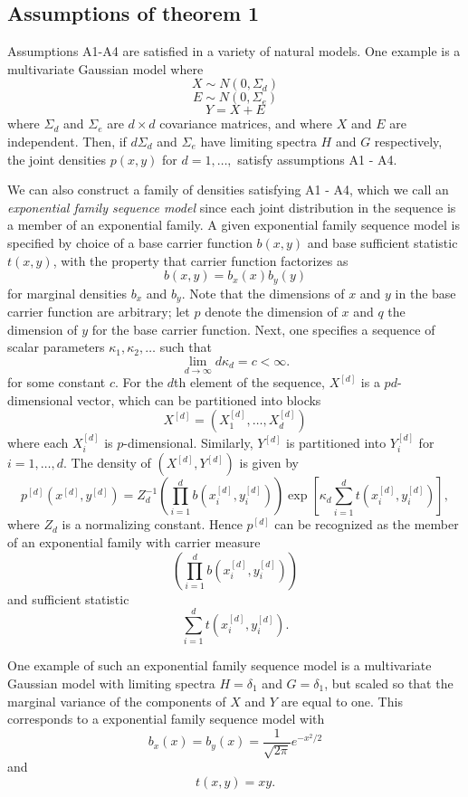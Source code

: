 \documentclass[12pt]{article}
\begin{document}
\subsection{Assumptions of theorem 1}

Assumptions A1-A4 are satisfied in a variety of natural models.
One example is a multivariate Gaussian model where
\[
X \sim N(0, \Sigma_d)
\]
\[
E \sim N(0, \Sigma_e)
\]
\[
Y = X + E
\]
where $\Sigma_d$ and $\Sigma_e$ are $d \times d$ covariance matrices, and where $X$ and $E$ are independent.  Then, if $d \Sigma_d$ and $\Sigma_e$ have limiting spectra $H$ and $G$ respectively,
the joint densities $p(x, y)$ for $d = 1,\hdots, $ satisfy assumptions A1 - A4.

We can also construct a family of densities satisfying A1 - A4,
which we call an \emph{exponential family sequence model} since each joint distribution in the sequence
is a member of an exponential family.
A given exponential family sequence model is specified by choice of a base carrier function $b(x, y)$ and base sufficient statistic $t(x, y)$, with the property that carrier function factorizes as
\[
b(x, y) = b_x(x) b_y(y)
\]
for marginal densities $b_x$ and $b_y$.
Note that the dimensions of $x$ and $y$ in the base carrier function are arbitrary;
let $p$ denote the dimension of $x$ and $q$ the dimension of $y$ for the base carrier function.
Next, one specifies a sequence of scalar parameters $\kappa_1, \kappa_2,\hdots$ such that
\[
\lim_{d \to \infty} d \kappa_d = c < \infty.
\]
for some constant $c$.
For the $d$th element of the sequence, $X^{[d]}$ is a $pd$-dimensional vector,
which can be partitioned into blocks
\[
X^{[d]} = (X_1^{[d]},\hdots, X_d^{[d]})
\]
where each $X_i^{[d]}$ is $p$-dimensional.  Similarly, $Y^{[d]}$ is partitioned into $Y_i^{[d]}$ for $i = 1,\hdots, d$.
The density of $(X^{[d]}, Y^{[d]})$ is given by
\[
p^{[d]}(x^{[d]}, y^{[d]}) = Z_d^{-1} \left(\prod_{i=1}^d b(x_i^{[d]}, y_i^{[d]}) \right) 
\exp\left[\kappa_d \sum_{i=1}^d t(x_i^{[d]}, y_i^{[d]}) \right],
\]
where $Z_d$ is a normalizing constant.
Hence $p^{[d]}$ can be recognized as the member of an exponential family with carrier measure
\[
\left(\prod_{i=1}^d b(x_i^{[d]}, y_i^{[d]}) \right)
\]
and sufficient statistic
\[
\sum_{i=1}^d t(x_i^{[d]}, y_i^{[d]}).
\]

One example of such an exponential family sequence model is a
multivariate Gaussian model with limiting spectra $H = \delta_1$ and
$G = \delta_1$, but scaled so that the marginal variance of the
components of $X$ and $Y$ are equal to one.  This corresponds to a
exponential family sequence model with
\[
b_x(x) = b_y(x) = \frac{1}{\sqrt{2\pi}} e^{-x^2/2}
\]
and
\[t(x, y) = xy.\]
\end{document}
